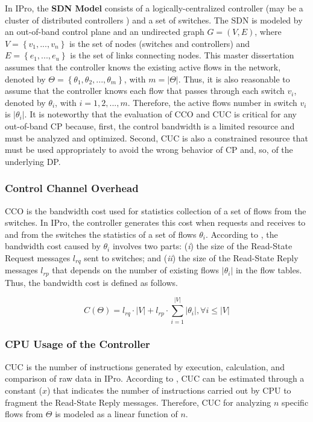 In IPro, the \textbf{SDN Model} consists of a logically-centralized controller (may be a cluster of distributed controllers \cite{jose_2011:online_measurement} \cite{tahaei_2018:distributed_controller}) and a set of switches. The SDN is modeled by an out-of-band control plane and an undirected graph $G=(V,E)$, where $V=\left \{ v_1,..., v_n \right \}$ is the set of nodes (switches and controllers) and $E=\left \{ e_1,..., e_u \right \}$ is the set of links connecting nodes. This master dissertation assumes that the controller knows the existing active flows in the network, denoted by $\Theta = \left \{ \theta_1, \theta_2, ..., \theta_m \right \} $, with $m=\left | \Theta  \right |$. Thus, it is also reasonable to assume that the controller knows each flow that passes through each switch $v_i$, denoted by $\theta_i$, with $i=1,2,...,m$. Therefore, the active flows number in switch $v_i$ is $\left | \theta_i  \right |$. It is noteworthy that the evaluation of CCO and CUC is critical for any out-of-band CP because, first, the control bandwidth is a limited resource and must be analyzed and optimized. Second, CUC is also a constrained resource that must be used appropriately to avoid the wrong behavior of CP and, so, of the underlying DP.

\subsubsection{Control Channel Overhead} 
CCO is the bandwidth cost used for statistics collection of a set of flows from the switches. In IPro, the controller generates this cost when requests and receives to and from the switches the statistics of a set of flows $\theta_i$. According to \cite{onf_2012:openflow}\cite{su_2015:cemon}, the bandwidth cost caused by $\theta_i$ involves two parts: (\textit{i}) the size of the Read-State Request messages $l_{rq}$ sent to switches; and (\textit{ii}) the size of the Read-State Reply messages  $l_{rp}$ that depends on the number of existing flows $\left | \theta_i  \right |$ in the flow tables. Thus, the bandwidth cost is defined as follows.

{\setlength{\mathindent}{4cm}
\begin{equation}
    C\left ( \Theta  \right ) = l_{rq} \cdot \left | V \right | + l_{rp} \cdot \sum_{i=1}^{\left | V \right |} \left | \theta_i \right |, \forall i \leqslant \left | V \right |
    \label{equ:load}
\end{equation}
}

\subsubsection{CPU Usage of the Controller}
CUC is the number of instructions generated by execution, calculation, and comparison of raw data in IPro. According to \cite{tahaei_2018:distributed_controller}, CUC can be estimated through a constant ($x$) that indicates the number of instructions carried out by CPU to fragment the Read-State Reply messages. Therefore, CUC for analyzing $n$ specific flows from $\Theta$ is modeled as a linear function of $n$.

